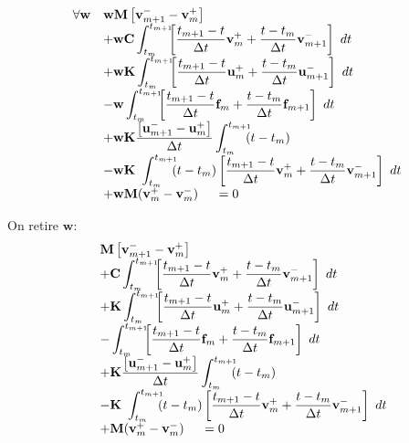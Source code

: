 \documentclass[12pt,a4paper]{report}
\begin{document}
\begin{equation}
\begin{array}{r l}
	\forall \mathbf{w}
	&\displaystyle
	 \mathbf{w} \mathbf{M}
	    	\left[ \mathbf{v}_{m+1}^- 
	    		- \mathbf{v}_m^+ \right]
	\\ 
	  &\displaystyle
	  +\mathbf{w} \mathbf{C}\int_{t_m}^{t_{m+1}} \!\!\! 	
		\left[
			\frac{t_{m+1}-t}{\Delta t} \mathbf{v}_m^+ + 
			\frac{t-t_m}{\Delta t} \mathbf{v}_{m+1}^- 
			\right] ~dt
	\\
	  &\displaystyle
	 +\mathbf{w} \mathbf{K}\int_{t_m}^{t_{m+1}} \!\!\! 	
		\left[
			\frac{t_{m+1}-t}{\Delta t} \mathbf{u}_m^+ + 
			\frac{t-t_m}{\Delta t} \mathbf{u}_{m+1}^- 
			\right] ~dt
	\\
	  &\displaystyle
	   -\mathbf{w} \int_{t_m}^{t_{m+1}} \!\!\!
		\left[
			\frac{t_{m+1}-t}{\Delta t} \mathbf{f}_m + 
			\frac{t-t_m}{\Delta t} \mathbf{f}_{m+1}
			\right] ~dt
	\\
	  &+\displaystyle
	    \mathbf{w} \mathbf{K}
	    	\frac{\left[ \mathbf{u}_{m+1}^- 
	    		- \mathbf{u}_m^+ \right]    }{\Delta t}			
			\int_{t_m}^{t_{m+1}} \!\!\! (t-t_m) 
	\\
	  &\displaystyle	    
	    -\mathbf{w} \mathbf{K}~\int_{t_m}^{t_{m+1}} \!\!\! 	
		(t-t_m) \left[
			\frac{t_{m+1}-t}{\Delta t} \mathbf{v}_m^+ + 
			\frac{t-t_m}{\Delta t} \mathbf{v}_{m+1}^- 
			\right] ~dt
	\\
	  &+  \mathbf{w} \mathbf{M}(\mathbf{v}_m^+ - \mathbf{v}_m^-)
	~~~~=0
\end{array}
\end{equation}

On retire  $\mathbf{w}$:
\begin{equation}
\begin{array}{r l}
	&\displaystyle
	 \mathbf{M}
	    	\left[ \mathbf{v}_{m+1}^- 
	    		- \mathbf{v}_m^+ \right]
	\\ 
	  &\displaystyle
	  +\mathbf{C}\int_{t_m}^{t_{m+1}} \!\!\! 	
		\left[
			\frac{t_{m+1}-t}{\Delta t} \mathbf{v}_m^+ + 
			\frac{t-t_m}{\Delta t} \mathbf{v}_{m+1}^- 
			\right] ~dt
	\\
	  &\displaystyle
	 +\mathbf{K}\int_{t_m}^{t_{m+1}} \!\!\! 	
		\left[
			\frac{t_{m+1}-t}{\Delta t} \mathbf{u}_m^+ + 
			\frac{t-t_m}{\Delta t} \mathbf{u}_{m+1}^- 
			\right] ~dt
	\\
	  &\displaystyle
	   -\int_{t_m}^{t_{m+1}} \!\!\!
		\left[
			\frac{t_{m+1}-t}{\Delta t} \mathbf{f}_m + 
			\frac{t-t_m}{\Delta t} \mathbf{f}_{m+1}
			\right] ~dt
	\\
	  &+\displaystyle
	    \mathbf{K}
	    	\frac{\left[ \mathbf{u}_{m+1}^- 
	    		- \mathbf{u}_m^+ \right]    }{\Delta t}			
			\int_{t_m}^{t_{m+1}} \!\!\! (t-t_m) 
	\\
	  &\displaystyle	    
	    -\mathbf{K}~\int_{t_m}^{t_{m+1}} \!\!\! 	
		(t-t_m) \left[
			\frac{t_{m+1}-t}{\Delta t} \mathbf{v}_m^+ + 
			\frac{t-t_m}{\Delta t} \mathbf{v}_{m+1}^- 
			\right] ~dt
	\\
	  &+  \mathbf{M}(\mathbf{v}_m^+ - \mathbf{v}_m^-)
	~~~~=0	
\end{array}
\end{equation}
\end{document}
